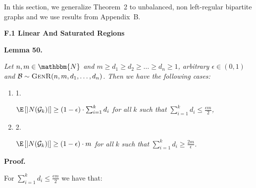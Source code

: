 In this section, we generalize Theorem 2 to unbalanced, non left-regular bipartite graphs and we use results from Appendix B.\par




\par\medskip\noindent\textbf{F.1 Linear And Saturated Regions}\par





\par\medskip\noindent\textbf{\textbf{Lemma 50}\textbf{.}}\par



\emph{Let $n,m\in\mathbbm{N}$ and $m\geq d_{1}\geq d_{2}\geq\dots\geq d_{n}\geq 1$, arbitrary $\epsilon\in(0,1)$ and $\mathcal{B}\sim\textsc{GenR}(n,m,d_{1},\dots,d_{n})$.
Then we have the following cases:}\par


\begin{enumerate}


\item[] 1. 


$\E\left[|N(\mathcal{G}_{k})|\right]\geq\left(1-\epsilon\right)\cdot\sum_{i=1}^{k}d_{i}$\emph{ for all }$k$\emph{ such that }$\sum_{i=1}^{k}d_{i}\leq\frac{\epsilon m}{2}$\emph{,}\par




\item[] 2. 


$\E\left[|N(\mathcal{G}_{k})|\right]\geq\left(1-\epsilon\right)\cdot m$\emph{ for all }$k$\emph{ such that }$\sum_{i=1}^{k}d_{i}\geq\frac{2m}{\epsilon}$\emph{.}\par




\end{enumerate}






\par\medskip\noindent\textbf{Proof.}\par



For $\sum_{i=1}^{k}d_{i}\leq\frac{\epsilon m}{2}$ we have that:\par


